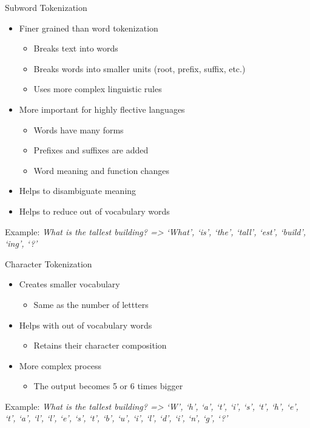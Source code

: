 \begin{vbframe}{Subword Tokenization}

\vfill

\begin{itemize}
	\item Finer grained than word tokenization
		\begin{itemize}
			\item Breaks text into words
			\item Breaks words into smaller units (root, prefix, suffix, etc.)
			\item Uses more complex linguistic rules
		\end{itemize}
	\item More important for highly flective languages
		\begin{itemize}
			\item Words have many forms
			\item Prefixes and suffixes are added
			\item Word meaning and function changes
		\end{itemize}
	\item Helps to disambiguate meaning 
	\item Helps to reduce out of vocabulary words
\end{itemize}

\vskip5mm
Example: \vskip3mm 
{\small\it What is the tallest building? => `What', `is', `the', `tall', `est', `build', `ing', `?'}

\vfill

\end{vbframe}


\begin{vbframe}{Character Tokenization}

\vfill

\begin{itemize}
	\item Creates smaller vocabulary
		\begin{itemize}
			\item Same as the number of lettters
		\end{itemize}
	\item Helps with out of vocabulary words
		\begin{itemize}
			\item Retains their character composition
		\end{itemize}
	\item More complex process
		\begin{itemize}
			\item The output becomes 5 or 6 times bigger
		\end{itemize}
\end{itemize}

\vskip5mm
Example: \vskip3mm 
{\small\it What is the tallest building? => `W', `h', `a', `t', `i', `s', `t', `h', `e', `t', `a', `l', `l', `e', `s', `t', `b', `u', `i', `l', `d', `i', `n', `g', `?'}

\vfill

\end{vbframe}

